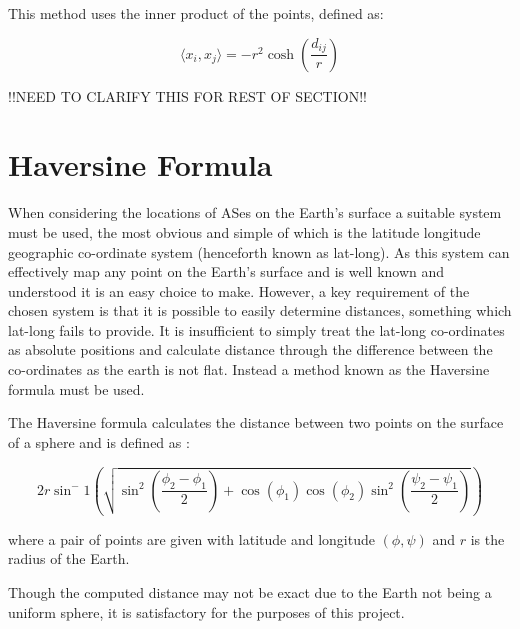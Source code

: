 This method uses the inner product of the points, defined as: 

\begin{equation}
\label{eq:inner_product_hyperbolic}
\langle x_i,x_j\rangle = -r^2\cosh \left(\frac{d_{ij}}{r}\right)
\end{equation}

!!NEED TO CLARIFY THIS FOR REST OF SECTION!!

\section{Haversine Formula}
When considering the locations of ASes on the Earth's surface a suitable system must be used, the most obvious and simple of which is the latitude longitude geographic co-ordinate system (henceforth known as lat-long). As this system can effectively map any point on the Earth's surface and is well known and understood it is an easy choice to make. However, a key requirement of the chosen system is that it is possible to easily determine distances, something which lat-long fails to provide. It is insufficient to simply treat the lat-long co-ordinates as absolute positions and calculate distance through the difference between the co-ordinates as the earth is not flat. Instead a method known as the Haversine formula must be used.

The Haversine formula calculates the distance between two points on the surface of a sphere and is defined as \cite{chopde_landmark_2013}:

\begin{equation}
\label{haversine_formula}
2r\sin^-1\left(\sqrt{\sin^2\left(\frac{\phi_2 - \phi_1}{2}\right) + \cos(\phi_1) \cos(\phi_2) \sin^2\left(\frac{\psi_2 - \psi_1}{2}\right)}\right)
\end{equation}

where a pair of points are given with latitude and longitude $(\phi,\psi)$ and $r$ is the radius of the Earth. 

Though the computed distance may not be exact due to the Earth not being a uniform sphere, it is satisfactory for the purposes of this project.